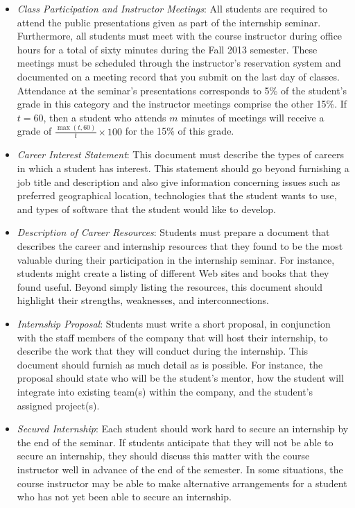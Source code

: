 \begin{itemize}

	\item {\em Class Participation and Instructor Meetings}: All students are required to attend the public
		presentations given as part of the internship seminar.  Furthermore, all students must meet with the
		course instructor during office hours for a total of sixty minutes during the Fall 2013 semester.  These
		meetings must be scheduled through the instructor's reservation system and documented on a meeting record that
		you submit on the last day of classes. Attendance at the seminar's presentations corresponds to 5\% of
		the student's grade in this category and the instructor meetings comprise the other 15\%. If $t=60$, then a
		student who attends $m$ minutes of meetings will receive a grade of $\frac{\max{(t,60)}}{t}\times100$ for the 15\%
		of this grade.
		
	\item {\em Career Interest Statement}: This document must describe the types of careers in which a student has
		interest. This statement should go beyond furnishing a job title and description and also give
		information concerning issues such as preferred geographical location, technologies that the student wants to
		use, and types of software that the student would like to develop. 	

	\item {\em Description of Career Resources}:  Students must prepare a document that describes the career and
		internship resources that they found to be the most valuable during their participation in the internship
		seminar. For instance, students might create a listing of different Web sites and books that they found useful. 
		Beyond simply listing the resources, this document should highlight their strengths, weaknesses, and interconnections. 		

	\item {\em Internship Proposal}: Students must write a short proposal, in conjunction with the staff members of the
		company that will host their internship, to describe the work that they will conduct during the internship.
		This document should furnish as much detail as is possible.  For instance, the proposal should state who will be
		the student's mentor, how the student will integrate into existing team(s) within the company, and the
		student's assigned project(s). 

	\item {\em Secured Internship}: Each student should work hard to secure an internship by the end of the seminar.  If
		students anticipate that they will not be able to secure an internship, they should discuss this matter with the
		course instructor well in advance of the end of the semester.  In some situations, the course instructor may be 
		able to make alternative arrangements for a student who has not yet been able to secure an internship.


\end{itemize}
